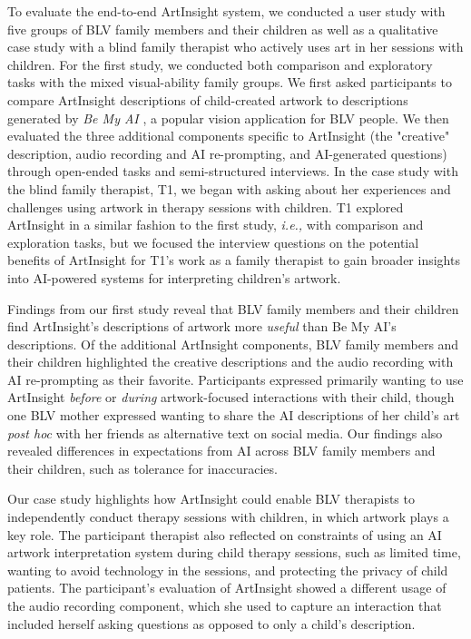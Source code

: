 \documentclass[sigconf]{acmart}
\begin{document}
To evaluate the end-to-end ArtInsight system, we conducted a user study with five groups of BLV family members and their children as well as a qualitative case study with a blind family therapist who actively uses art in her sessions with children. For the first study, we conducted both comparison and exploratory tasks with the mixed visual-ability family groups. We first asked participants to compare ArtInsight descriptions of child-created artwork to descriptions generated by \textit{Be My AI} \cite{be_my_ai_2024}, a popular vision application for BLV people. We then evaluated the three additional components specific to ArtInsight (the "creative" description, audio recording and AI re-prompting, and AI-generated questions) through open-ended tasks and semi-structured interviews. In the case study with the blind family therapist, T1, we began with asking about her experiences and challenges using artwork in therapy sessions with children. T1 explored ArtInsight in a similar fashion to the first study, \textit{i.e.,} with comparison and exploration tasks, but we focused the interview questions on the potential benefits of ArtInsight for T1’s work as a family therapist to gain broader insights into AI-powered systems for interpreting children’s artwork.

Findings from our first study reveal that BLV family members and their children find ArtInsight's descriptions of artwork more \textit{useful} than Be My AI's descriptions. Of the additional ArtInsight components, BLV family members and their children highlighted the creative descriptions and the audio recording with AI re-prompting as their favorite. Participants expressed primarily wanting to use ArtInsight \textit{before} or \textit{during} artwork-focused interactions with their child, though one BLV mother expressed wanting to share the AI descriptions of her child's art \textit{post hoc} with her friends as alternative text on social media. Our findings also revealed differences in expectations from AI across BLV family members and their children, such as tolerance for inaccuracies.

Our case study highlights how ArtInsight could enable BLV therapists to independently conduct therapy sessions with children, in which artwork plays a key role. The participant therapist also reflected on constraints of using an AI artwork interpretation system during child therapy sessions, such as limited time, wanting to avoid technology in the sessions, and protecting the privacy of child patients. The participant's evaluation of ArtInsight showed a different usage of the audio recording component, which she used to capture an interaction that included herself asking questions as opposed to only a child's description.
\end{document}
